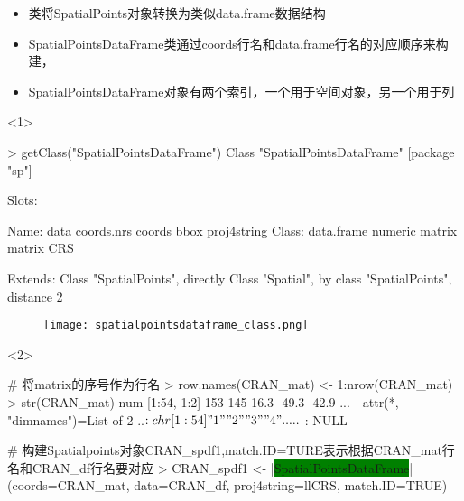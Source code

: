 \begin{frame}[t,fragile]{\subsecname}{\subsubsecname}
\begin{itemize}
\item<1-> 类将SpatialPoints对象转换为类似data.frame数据结构
\item<2-> SpatialPointsDataFrame类通过coords行名和data.frame行名的对应顺序来构建，
\item<4-> SpatialPointsDataFrame对象有两个索引，一个用于空间对象，另一个用于列
\end{itemize}

\begin{overlayarea}{\textwidth}{\textheight}
\begin{onlyenv}<1>
\begin{rcode}
> getClass("SpatialPointsDataFrame")
Class "SpatialPointsDataFrame" [package "sp"]

Slots:                                                                  

Name:         data  coords.nrs      coords        bbox proj4string
Class:  data.frame     numeric      matrix      matrix         CRS

Extends: 
Class "SpatialPoints", directly
Class "Spatial", by class "SpatialPoints", distance 2
\end{rcode}
\begin{figure}[ht]\vspace{-10pt}
  \texttt{[image: spatialpointsdataframe\_class.png]}
\end{figure}
\end{onlyenv}

\begin{onlyenv}<2>
\begin{rcode}
# 将matrix的序号作为行名
> row.names(CRAN_mat) <- 1:nrow(CRAN_mat)
> str(CRAN_mat)
 num [1:54, 1:2] 153 145 16.3 -49.3 -42.9 ...
 - attr(*, "dimnames")=List of 2
  ..$ : chr [1:54] "1" "2" "3" "4" ...
  ..$ : NULL

# 构建Spatialpoints对象CRAN\_spdf1,match.ID=TURE表示根据CRAN\_mat行名和CRAN\_df行名要对应
> CRAN_spdf1 <- |\colorbox{green}{SpatialPointsDataFrame}|(coords=CRAN_mat, data=CRAN_df, proj4string=llCRS, match.ID=TRUE)
\end{rcode}
\end{onlyenv}


\end{overlayarea}
\end{frame}
